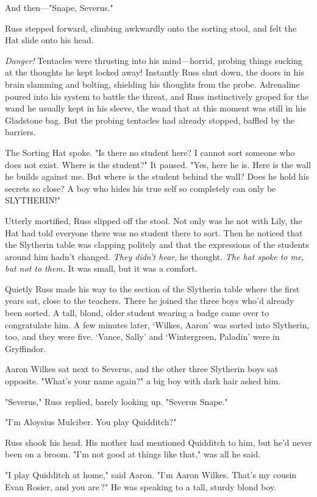 And then—"Snape, Severus."

Russ stepped forward, climbing awkwardly onto the sorting stool, and felt the Hat slide onto his head.

\emph{Danger!} Tentacles were thrusting into his mind—horrid, probing things sucking at the thoughts he kept locked away! Instantly Russ shut down, the doors in his brain slamming and bolting, shielding his thoughts from the probe. Adrenaline poured into his system to battle the threat, and Russ instinctively groped for the wand he usually kept in his sleeve, the wand that at this moment was still in his Gladstone bag. But the probing tentacles had already stopped, baffled by the barriers.

The Sorting Hat spoke. "Is there no student here? I cannot sort someone who does not exist. Where is the student?" It paused. "Yes, here he is. Here is the wall he builds against me. But where is the student behind the wall? Does he hold his secrets so close? A boy who hides his true self so completely can only be{\el} SLYTHERIN!"

Utterly mortified, Russ slipped off the stool. Not only was he not with Lily, the Hat had told everyone there was no student there to sort. Then he noticed that the Slytherin table was clapping politely and that the expressions of the students around him hadn't changed. \emph{They didn't hear}, he thought. \emph{The hat spoke to me, but not to them.} It was small, but it was a comfort.

Quietly Russ made his way to the section of the Slytherin table where the first years sat, close to the teachers. There he joined the three boys who'd already been sorted. A tall, blond, older student wearing a badge came over to congratulate him. A few minutes later, `Wilkes, Aaron' was sorted into Slytherin, too, and they were five. `Vance, Sally' and `Wintergreen, Paladin' were in Gryffindor.

Aaron Wilkes sat next to Severus, and the other three Slytherin boys sat opposite. "What's your name again?" a big boy with dark hair asked him.

"Severus," Russ replied, barely looking up. "Severus{\el} Snape."

"I'm Aloysius Mulciber. You play Quidditch?"

Russ shook his head. His mother had mentioned Quidditch to him, but he'd never been on a broom. "I'm not{\el} good at things like{\el} that," was all he said.

"I play Quidditch at home," said Aaron. "I'm Aaron Wilkes. That's my cousin Evan Rosier, and you are{\el}\,?" He was speaking to a tall, sturdy blond boy.

